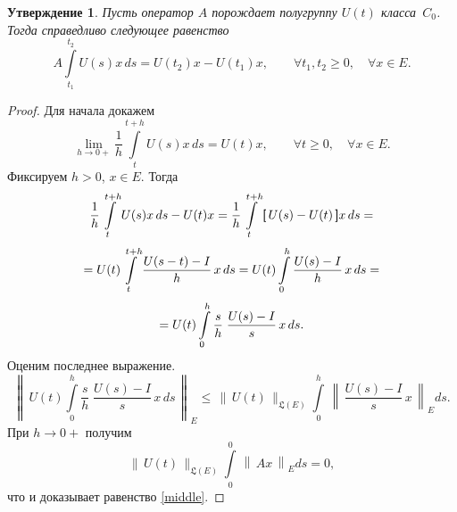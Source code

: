 \documentclass{article}
\renewcommand{\le}{\leqslant}
\renewcommand{\ge}{\geqslant}
\newcommand{\h}{\textsf}
\newtheorem{statement}{Утверждение}
\theoremstyle{definition}
\begin{document}
\begin{statement} \label{A = d/dx}
	Пусть оператор $A$ порождает полугруппу $U(t)$ класса~$C_0$. Тогда 
	справедливо следующее равенство
	\begin{equation} \label{integral identity}
		A \int\limits_{t_1}^{t_2} U(s)x\,ds = U(t_2)x - U(t_1)x, \qquad \forall t_1, t_2 \ge 0, \quad \forall x \in E.
	\end{equation}
\end{statement}

\begin{proof}
	Для начала докажем
	\begin{equation} \label{middle}
		\lim\limits_{h \rightarrow 0+} \frac{1}{h} \int\limits_{t}^{t + h} U(s)x\,ds = U(t)x, 
		\qquad \forall t \ge 0, \quad  \forall x \in E.
	\end{equation}
	Фиксируем $h > 0$, $x \in E$. Тогда
	\begin{gather*}
		\frac{1}{h} \int\limits_{t}^{t + h} U(s)x\,ds - U(t)x = 
		\frac{1}{h} \int\limits_{t}^{t + h} \h[\, U(s) - U(t) \,\h]x\,ds = \\[1mm]
		= U(t) \int\limits_{t}^{t + h} \frac{U(s - t) - I}{h}\,x\,ds =
		U(t) \int\limits_{0}^{h} \frac{U(s) - I}{h}\,x\,ds = \\[1mm]
		= U(t) \int\limits_{0}^{h} \frac{s}{h} \; \frac{U(s) - I}{s}\,x\,ds.
	\end{gather*}
	Оценим последнее выражение.
	\begin{equation*}
		\left\|\, U(t) \int\limits_{0}^{h} \frac{s}{h} \; \frac{U(s) - I}{s}\,x\,ds \,\right\|_E
		\le \,\|\, U(t) \,\|_{\mathfrak{L}(E)} \int\limits_{0}^{h} \, \left\|\, \frac{U(s) - I}{s}\,x \,\right\|_E ds.
	\end{equation*}
	При $ h \rightarrow 0+ $ получим 
	\begin{equation*}
		\|\, U(t) \,\|_{\mathfrak{L}(E)} \int\limits_{0}^{0} \, \left\|\, Ax \,\right\|_E ds = 0,
	\end{equation*}
	что и доказывает равенство \eqref{middle}. 
	

\end{proof}
\end{document}
